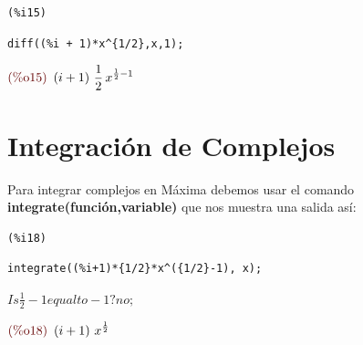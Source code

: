 \documentclass[10pt,a4paper]{book}
\begin{document}
\noindent
\begin{minipage}[t]{8ex}{\color{red}\bf
\begin{verbatim}
(%i15) 
\end{verbatim}}
\end{minipage}
\begin{minipage}[t]{\textwidth}{\color{blue}
\begin{verbatim}
diff((%i + 1)*x^{1/2},x,1);
\end{verbatim}}
\end{minipage}
\begin{math}\displaystyle
\parbox{8ex}{\color{labelcolor}(\%o15) }
\left( i+1\right) \,{\frac{1}{2}}\,{x}^{{\frac{1}{2}}-1}
\end{math}
\section{Integración de Complejos}
Para integrar complejos en Máxima debemos usar el comando \textbf{integrate(función,variable)} que nos muestra una salida así: 

\noindent
\begin{minipage}[t]{8ex}{\color{red}\bf
\begin{verbatim}
(%i18) 
\end{verbatim}}
\end{minipage}
\begin{minipage}[t]{\textwidth}{\color{blue}
\begin{verbatim}
integrate((%i+1)*{1/2}*x^({1/2}-1), x);
\end{verbatim}}
\end{minipage}
\begin{math}\displaystyle
Is {\frac{1}{2}}-1 equal to -1?no;
\end{math}

\begin{math}\displaystyle
\parbox{8ex}{\color{labelcolor}(\%o18) }
\left( i+1\right) \,{x}^{{\frac{1}{2}}}
\end{math}
\end{document}
